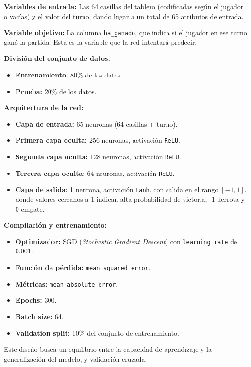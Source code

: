 \documentclass[conference,a4paper]{IEEEtran}
\begin{document}
\textbf{Variables de entrada:} Las 64 casillas del tablero (codificadas según el jugador o vacías) y el valor del turno, dando lugar a un total de 65 atributos de entrada.

\textbf{Variable objetivo:} La columna \texttt{ha\_ganado}, que indica si el jugador en ese turno ganó la partida. Esta es la variable que la red intentará predecir.

\textbf{División del conjunto de datos:}
\begin{itemize}
    \item \textbf{Entrenamiento:} 80\% de los datos.
    \item \textbf{Prueba:} 20\% de los datos.
\end{itemize}

\textbf{Arquitectura de la red:}
\begin{itemize}
    \item \textbf{Capa de entrada:} 65 neuronas (64 casillas + turno).
    \item \textbf{Primera capa oculta:} 256 neuronas, activación \texttt{ReLU}.
    \item \textbf{Segunda capa oculta:} 128 neuronas, activación \texttt{ReLU}.
    \item \textbf{Tercera capa oculta:} 64 neuronas, activación \texttt{ReLU}.
    \item \textbf{Capa de salida:} 1 neurona, activación \texttt{tanh}, con salida en el rango $[-1, 1]$, donde valores cercanos a 1 indican alta probabilidad de victoria, -1 derrota y 0 empate.
\end{itemize}

\textbf{Compilación y entrenamiento:}
\begin{itemize}
    \item \textbf{Optimizador:} SGD (\textit{Stochastic Gradient Descent}) con \texttt{learning rate} de 0.001.
    \item \textbf{Función de pérdida:} \texttt{mean\_squared\_error}.
    \item \textbf{Métricas:} \texttt{mean\_absolute\_error}.
    \item \textbf{Epochs:} 300.
    \item \textbf{Batch size:} 64.
    \item \textbf{Validation split:} 10\% del conjunto de entrenamiento.
\end{itemize}

Este diseño busca un equilibrio entre la capacidad de aprendizaje y la generalización del modelo, y validación cruzada.
\end{document}
